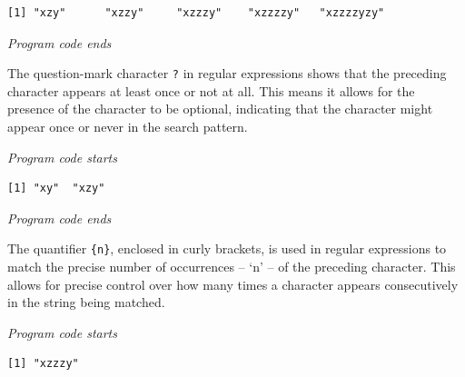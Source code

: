 \begin{verbatim}
[1] "xzy"      "xzzy"     "xzzzy"    "xzzzzy"   "xzzzzyzy"
\end{verbatim}

\emph{Program code ends}

The question-mark character \texttt{?} in regular expressions shows that
the preceding character appears at least once or not at all. This means it allows for the
presence of the character to be optional, indicating that the character
might appear once or never in the search pattern.

\emph{Program code starts}

\begin{Shaded}
\begin{Highlighting}[]
\NormalTok{(} \NormalTok{)}
\end{Highlighting}
\end{Shaded}

\begin{verbatim}
[1] "xy"  "xzy"
\end{verbatim}

\emph{Program code ends}

The quantifier \texttt{\{n\}}, enclosed in curly brackets, is used in
regular expressions to match the precise number of occurrences – `n' – of the preceding
character. This allows for precise control over how many times a
character appears consecutively in the string being matched.

\emph{Program code starts}

\begin{Shaded}
\begin{Highlighting}[]
\NormalTok{(} \NormalTok{)}
\end{Highlighting}
\end{Shaded}

\begin{verbatim}
[1] "xzzzy"
\end{verbatim}

